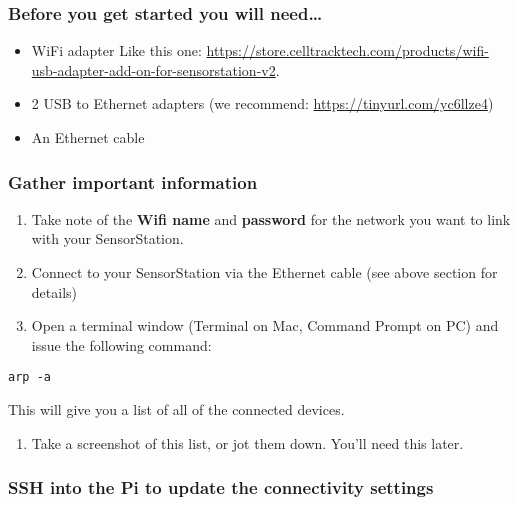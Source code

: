 \documentclass[
]{article}
\providecommand{\tightlist}{%
  \setlength{\itemsep}{0pt}\setlength{\parskip}{0pt}}
\begin{document}
\hypertarget{before-you-get-started-you-will-need-1}{%
\subsubsection{Before you get started you will
need\ldots{}}\label{before-you-get-started-you-will-need-1}}

\begin{itemize}
\tightlist
\item
  WiFi adapter Like this one:
  \url{https://store.celltracktech.com/products/wifi-usb-adapter-add-on-for-sensorstation-v2}.
\item
  2 USB to Ethernet adapters (we recommend:
  \url{https://tinyurl.com/yc6llze4})
\item
  An Ethernet cable
\end{itemize}

\hypertarget{gather-important-information}{%
\subsubsection{Gather important
information}\label{gather-important-information}}

\begin{enumerate}
\def\labelenumi{\arabic{enumi}.}
\tightlist
\item
  Take note of the \textbf{Wifi name} and \textbf{password} for the
  network you want to link with your SensorStation.
\item
  Connect to your SensorStation via the Ethernet cable (see above
  section for details)
\item
  Open a terminal window (Terminal on Mac, Command Prompt on PC) and
  issue the following command:
\end{enumerate}

\texttt{arp\ -a}

This will give you a list of all of the connected devices.

\begin{enumerate}
\def\labelenumi{\arabic{enumi}.}
\setcounter{enumi}{3}
\tightlist
\item
  Take a screenshot of this list, or jot them down. You'll need this
  later.
\end{enumerate}

\hypertarget{ssh-into-the-pi-to-update-the-connectivity-settings}{%
\subsubsection{SSH into the Pi to update the connectivity
settings}\label{ssh-into-the-pi-to-update-the-connectivity-settings}}
\end{document}
